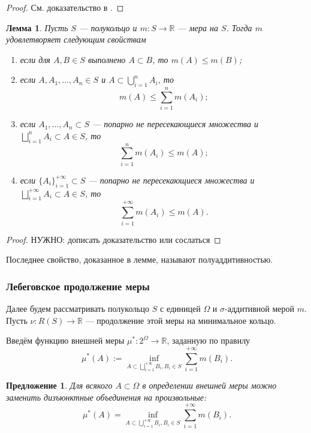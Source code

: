 \documentclass[12pt]{article}
\newtheorem{proposition}[theorem]{Предложение}
\newtheorem{lemma}[theorem]{Лемма}
\numberwithin{theorem}{section}
\theoremstyle{definition}
\newcommand{\defin}[2]{\hypertarget{#2}{{\color{red} #1}}}
\newcommand{\RR}{\mathbb{R}}
\newcommand{\TODO}[1]{\textcolor{todocolor}{НУЖНО: #1}}
\begin{document}
	\begin{proof}
		См. доказательство в \cite[Глава 1, Теорема 2.2]{DiyachenoUliyanov}.
	\end{proof}
	
	\begin{lemma}
		Пусть $ S $ --- полукольцо и $ m \colon S \to \mathbb{R} $ --- мера на $ S $.
		Тогда $ m $ удовлетворяет следующим свойствам
		\begin{enumerate}
			\item если для $ A, B \in S $ выполнено $ A \subset B $, то $ m(A) \leqslant m(B) $;
			\item если $ A, A_1, \ldots, A_n \in S $ и $ A \subset \bigcup\limits_{i = 1}^{n} A_i $, 
			то $$ m(A) \leqslant \sum\limits_{i = 1}^{n} m(A_i); $$
			\item если $ A_1, \ldots, A_n \subset S $ ---  попарно не пересекающиеся множества
			и $ \bigsqcup\limits_{i = 1}^{n} A_i \subset A \in S $, то 
			$$ \sum\limits_{i = 1}^{n} m(A_i) \leqslant m(A); $$
			\item если $ \{A_i\}_{i = 1}^{+\infty} \subset S $ ---  попарно не пересекающиеся множества
			и $ \bigsqcup\limits_{i = 1}^{+\infty} A_i \subset A \in S $, то 
			$$ \sum\limits_{i = 1}^{+\infty} m(A_i) \leqslant m(A). $$
		\end{enumerate}
	\end{lemma}
	
	\begin{proof}
		\TODO{дописать доказательство или сослаться}
	\end{proof}
	
	Последнее свойство, доказанное в лемме, называют \defin{полуаддитивностью}{semi-additivity}.
	
	\subsubsection{Лебеговское продолжение меры}
	
	Далее будем рассматривать полукольцо $ S $ с единицей $ \Omega $
	и $ \sigma $-аддитивной мерой $ m $.
	Пусть $ \nu \colon R(S) \to \RR $ --- продолжение этой меры на минимальное кольцо.
	
	Введём функцию \defin{внешней меры}{outer-measure} $ \mu^* \colon 2^{\Omega} \to \RR $, заданную по правилу
	$$ \mu^*(A) := \inf\limits_{A \subset \bigsqcup\limits_{i = 1}^{+\infty} B_i, B_i \in S} 
	\sum\limits_{i = 1}^{+\infty} m(B_i). $$
	
	\begin{proposition}
		Для всякого $ A \subset \Omega $ в определении внешней меры можно заменить дизъюнктные объединения на произвольные:
		$$ \mu^*(A) = \inf\limits_{A \subset \bigcup\limits_{i = 1}^{+\infty} B_i, B_i \in S} 
		\sum\limits_{i = 1}^{+\infty} m(B_i). $$
	\end{proposition}
	
\end{document}
